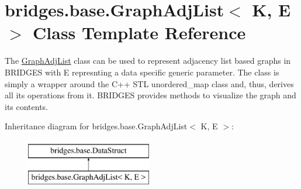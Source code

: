 \hypertarget{classbridges_1_1base_1_1_graph_adj_list}{}\section{bridges.\+base.\+Graph\+Adj\+List$<$ K, E $>$ Class Template Reference}
\label{classbridges_1_1base_1_1_graph_adj_list}


The \hyperlink{classbridges_1_1base_1_1_graph_adj_list}{Graph\+Adj\+List} class can be used to represent adjacency list based graphs in B\+R\+I\+D\+G\+ES with E represnting a data specific generic parameter. The class is simply a wrapper around the C++ S\+TL unordered\+\_\+map class and, thus, derives all its operations from it. B\+R\+I\+D\+G\+ES provides methods to visualize the graph and its contents.  


Inheritance diagram for bridges.\+base.\+Graph\+Adj\+List$<$ K, E $>$\+:\begin{figure}[H]
\begin{center}
\leavevmode
\includegraphics[height=2.000000cm]{classbridges_1_1base_1_1_graph_adj_list}
\end{center}
\end{figure}
